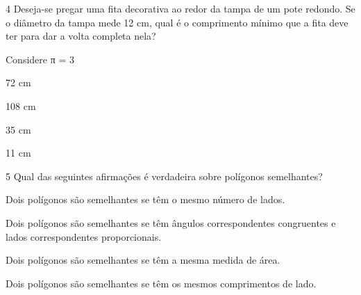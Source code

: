 
\num{4} Deseja-se pregar uma fita decorativa ao redor da tampa de um pote
redondo. Se o diâmetro da tampa mede 12 cm, qual é o comprimento mínimo
que a fita deve ter para dar a volta completa nela?

Considere π = 3
\item 72 cm
\item 108 cm
\item 35 cm
\item 11 cm







\num{5} Qual das seguintes afirmações é verdadeira sobre polígonos
semelhantes?
\item Dois polígonos são semelhantes se têm o mesmo número de lados.
\item Dois polígonos são semelhantes se têm ângulos correspondentes
congruentes e lados correspondentes proporcionais.
\item Dois polígonos são semelhantes se têm a mesma medida de área.
\item Dois polígonos são semelhantes se têm os mesmos comprimentos de lado.



